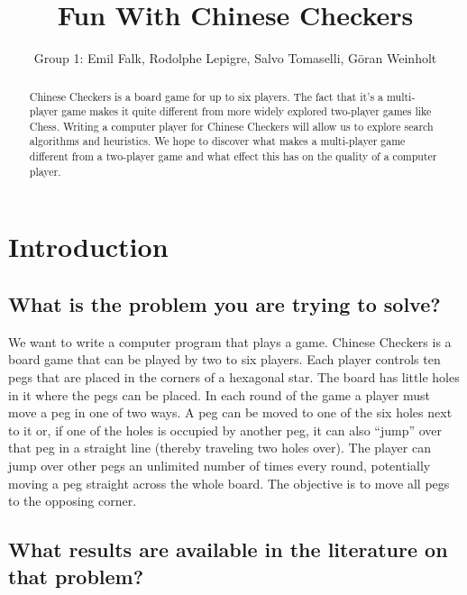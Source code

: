 \documentclass[a4paper,11pt]{report}
\begin{document}
\title{Fun With Chinese Checkers}
\author{Group 1: Emil Falk, Rodolphe Lepigre, Salvo Tomaselli, Göran Weinholt}
\maketitle
\begin{abstract}\centering

Chinese Checkers is a board game for up to six players. The fact that
it's a multi-player game makes it quite different from more widely
explored two-player games like Chess. Writing a computer player for
Chinese Checkers will allow us to explore search algorithms and
heuristics. We hope to discover what makes a multi-player game
different from a two-player game and what effect this has on the
quality of a computer player.

\end{abstract}

\chapter{Introduction}
\section{What is the problem you are trying to solve?}

We want to write a computer program that plays a game. Chinese
Checkers is a board game that can be played by two to six players.
Each player controls ten pegs that are placed in the corners of a
hexagonal star. The board has little holes in it where the pegs can be
placed. In each round of the game a player must move a peg in one of
two ways. A peg can be moved to one of the six holes next to it or, if
one of the holes is occupied by another peg, it can also ``jump'' over
that peg in a straight line (thereby traveling two holes over). The
player can jump over other pegs an unlimited number of times every
round, potentially moving a peg straight across the whole board. The
objective is to move all pegs to the opposing corner.

\section{What results are available in the literature on that problem?}
\end{document}
